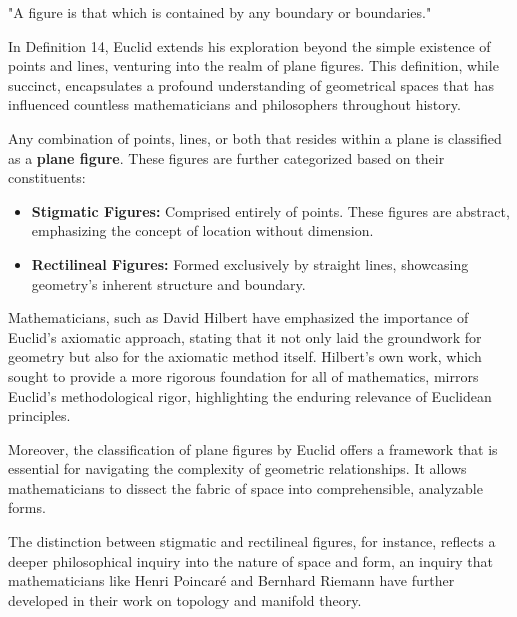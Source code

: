 
\begin{defin}
"A figure is that which is contained by any boundary or boundaries."
\end{defin}

In Definition 14, Euclid extends his exploration beyond the simple existence of points and lines, venturing into the realm of plane figures. This definition, while succinct, encapsulates a profound understanding of geometrical spaces that has influenced countless mathematicians and philosophers throughout history.

Any combination of points, lines, or both that resides within a plane is classified as a \textbf{plane figure}. These figures are further categorized based on their constituents:
\begin{itemize}
\item \textbf{Stigmatic Figures:} Comprised entirely of points. These figures are abstract, emphasizing the concept of location without dimension.
\item \textbf{Rectilineal Figures:} Formed exclusively by straight lines, showcasing geometry’s inherent structure and boundary.
\end{itemize}

Mathematicians, such as David Hilbert have emphasized the importance of Euclid’s axiomatic approach, stating that it not only laid the groundwork for geometry but also for the axiomatic method itself. Hilbert's own work, which sought to provide a more rigorous foundation for all of mathematics, mirrors Euclid’s methodological rigor, highlighting the enduring relevance of Euclidean principles.

Moreover, the classification of plane figures by Euclid offers a framework that is essential for navigating the complexity of geometric relationships. It allows mathematicians to dissect the fabric of space into comprehensible, analyzable forms. 

\clearpage

The distinction between stigmatic and rectilineal figures, for instance, reflects a deeper philosophical inquiry into the nature of space and form, an inquiry that mathematicians like Henri Poincaré and Bernhard Riemann have further developed in their work on topology and manifold theory.

